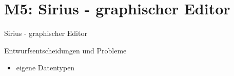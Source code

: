 \section[M5: Sirius]{M5: Sirius - graphischer Editor}
\begin{frame}{Sirius - graphischer Editor}
	\centering
\end{frame}

\begin{frame}{Entwurfsentscheidungen und Probleme}
	\begin{itemize}
		\item eigene Datentypen
	\end{itemize}
\end{frame}
